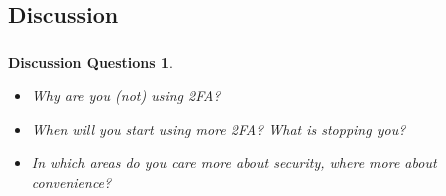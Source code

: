 \subsection*{Discussion}
\begin{frame}
  \frametitle{\currentsectionname}

  \newtheorem{discussion}{Discussion Questions}
  \begin{discussion}
    \begin{itemize}
      \item Why are you (not) using 2FA?
      \item When will you start using more 2FA? What is stopping you?
      \item In which areas do you care more about security, where more about convenience?
    \end{itemize}
  \end{discussion}

\end{frame}
